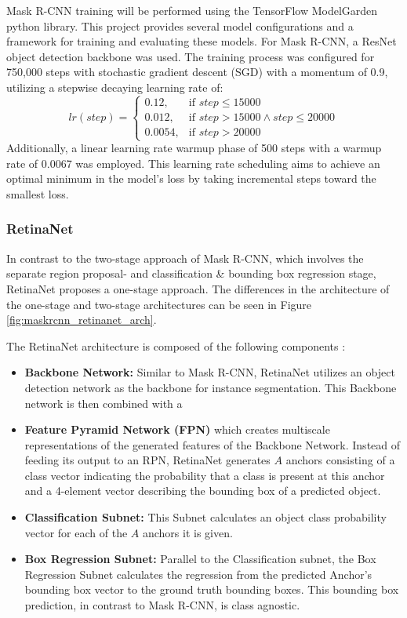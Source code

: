\documentclass[draft,final]{vutinfth} %
\begin{document}
Mask R-CNN training will be performed using the TensorFlow ModelGarden \cite{yu_tensorflow_2020} python library. This project provides several model configurations and a framework for training and evaluating these models. For Mask R-CNN, a ResNet object detection backbone was used. The training process was configured for 750,000 steps with stochastic gradient descent (SGD) with a momentum of 0.9, utilizing a stepwise decaying learning rate of:
\[
    lr(step)= 
\begin{cases}
    0.12,& \text{if } step \leq 15000\\
    0.012,& \text{if } step > 15000 \land step \leq 20000\\
    0.0054,& \text{if } step > 20000
\end{cases}
\]
Additionally, a linear learning rate warmup phase of 500 steps with a warmup rate of 0.0067 was employed.
This learning rate scheduling aims to achieve an optimal minimum in the model's loss by taking incremental steps toward the smallest loss.

\subsubsection{RetinaNet}
In contrast to the two-stage approach of Mask R-CNN, which involves the separate region proposal- and classification \& bounding box regression stage, RetinaNet proposes a one-stage approach. The differences in the architecture of the one-stage and two-stage architectures can be seen in Figure \ref{fig:maskrcnn_retinanet_arch}.

The RetinaNet architecture is composed of the following components \cite{lin_focal_2018}:

\begin{itemize}
    \item \textbf{Backbone Network:} Similar to Mask R-CNN, RetinaNet utilizes an object detection network as the backbone for instance segmentation. This Backbone network is then combined with a
    \item \textbf{Feature Pyramid Network (FPN)} which creates multiscale representations of the generated features of the Backbone Network. Instead of feeding its output to an RPN, RetinaNet generates $A$ anchors consisting of a class vector indicating the probability that a class is present at this anchor and a 4-element vector describing the bounding box of a predicted object.
    \item \textbf{Classification Subnet:} This Subnet calculates an object class probability vector for each of the $A$ anchors it is given. 
    \item \textbf{Box Regression Subnet:} Parallel to the Classification subnet, the Box Regression Subnet calculates the regression from the predicted Anchor's bounding box vector to the ground truth bounding boxes. This bounding box prediction, in contrast to Mask R-CNN, is class agnostic.
\end{itemize}
\end{document}
